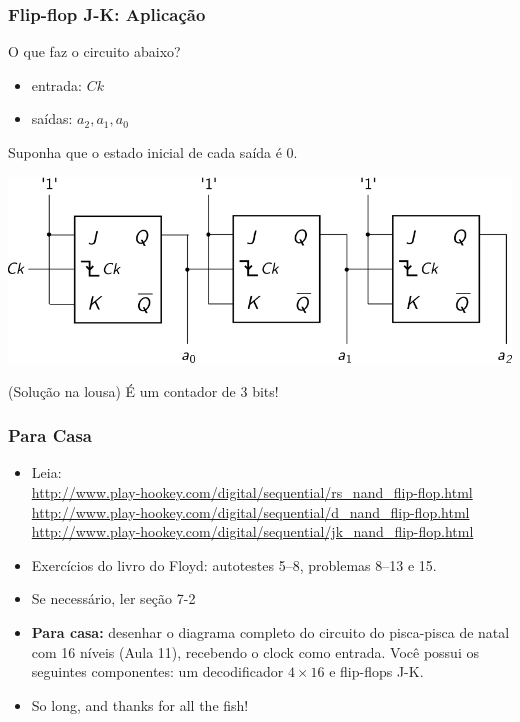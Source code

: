 \documentclass{beamer}
\begin{document}
\begin{frame}
\frametitle{Flip-flop J-K: Aplicação}

O que faz o circuito abaixo?
\begin{itemize}
\item entrada: $Ck$
\item saídas: $a_2, a_1, a_0$
\end{itemize}
Suponha que o estado inicial de cada saída é $0$.

\vspace{12pt}

\includegraphics[width=\textwidth]{images/counter}

(Solução na lousa) \pause É um contador de $3$ bits!

\end{frame}

\begin{frame}
\frametitle{Para Casa}

\begin{itemize}
\item Leia:\\
{\footnotesize
\hspace{-2ex}	\url{http://www.play-hookey.com/digital/sequential/rs_nand_flip-flop.html}\\
\hspace{-2ex}	\url{http://www.play-hookey.com/digital/sequential/d_nand_flip-flop.html}\\
\hspace{-2ex}	\url{http://www.play-hookey.com/digital/sequential/jk_nand_flip-flop.html}\\
}
\item Exercícios do livro do Floyd: autotestes 5--8, problemas 8--13 e 15.
\item Se necessário, ler seção 7-2
\item \textbf{Para casa:} desenhar o diagrama completo do circuito do pisca-pisca de natal
com 16 níveis (Aula 11), recebendo o clock como entrada. Você possui os seguintes componentes:
um decodificador $4 \times 16$ e flip-flops J-K.
\pause
\item So long, and thanks for all the fish!
\end{itemize}
\end{frame}
\end{document}
